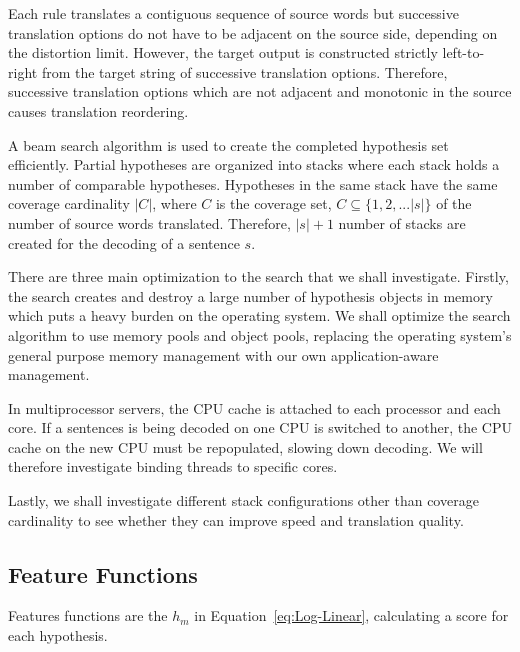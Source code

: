 \documentclass[11pt]{article}
\begin{document}
Each rule translates a contiguous sequence of source words but successive translation options do not have to be adjacent on the source side, depending on the distortion limit. However, the target output is constructed strictly left-to-right from the target string of successive translation options. Therefore, successive translation options which are not adjacent and monotonic in the source causes translation reordering.

A beam search algorithm is used to create the completed hypothesis set efficiently. Partial hypotheses are organized into stacks where each stack holds a number of comparable hypotheses. Hypotheses in the same stack have the same coverage cardinality $|C|$, where $C$ is  the coverage set, $C \subseteq \{1,2,... |s| \} $ of the number of  source words translated. Therefore, $|s| + 1$ number of stacks are created for the decoding of a sentence $s$. 

There are three main optimization to the search that we shall investigate. Firstly, the search creates and destroy a large number of hypothesis objects in memory which puts a heavy burden on the operating system. We shall optimize the search algorithm to use memory pools and object pools, replacing the operating system's general purpose memory management with our own application-aware management. 


In multiprocessor servers, the CPU cache is attached to each processor and each core. If a sentences is being decoded on one CPU is switched to another, the CPU cache on the new CPU must be repopulated, slowing down decoding. We will therefore investigate binding threads to specific cores.

Lastly, we shall investigate different stack configurations other than coverage cardinality to see whether they can improve speed and translation quality.

\subsection{Feature Functions}

Features functions are the $h_m$ in Equation~\ref{eq:Log-Linear}, calculating a score for each hypothesis.
\end{document}
